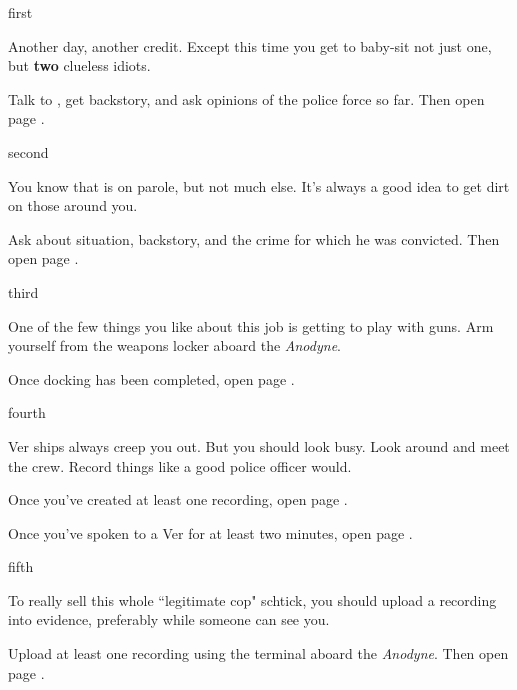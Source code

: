 \documentclass[greennotebook]{guildcamp4} %
\begin{document}
\startnotebook{\nCbadNotebook{}}

\begin{page}{first}

Another day, another credit. Except this time you get to baby-sit not just one, but {\bf two} clueless idiots.

Talk to \cCgood{}, get \cCgood{\their} backstory, and ask \cCgood{\their} opinions of the police force so far. Then open page .

\end{page}

\begin{page}{second}

You know that \cPilot{} is on parole, but not much else. It's always a good idea to get dirt on those around you.

Ask \cPilot{} about \cPilot{\their} situation, \cPilot{\their} backstory, and the crime for which he was convicted. Then open page .

\end{page}

\begin{page}{third}

One of the few things you like about this job is getting to play with guns. Arm yourself from the weapons locker aboard the \emph{Anodyne}.

Once docking has been completed, open page .

\end{page}

\begin{page}{fourth}

Ver ships always creep you out. But you should look busy. Look around and meet the crew. Record things like a good police officer would.

Once you've created at least one recording, open page .

Once you've spoken to a Ver for at least two minutes, open page .

\end{page}

\begin{page}{fifth}

To really sell this whole ``legitimate cop" schtick, you should upload a recording into evidence, preferably while someone can see you. 

Upload at least one recording using the terminal aboard the \emph {Anodyne}. Then open page .

\end{page}
\end{document}
